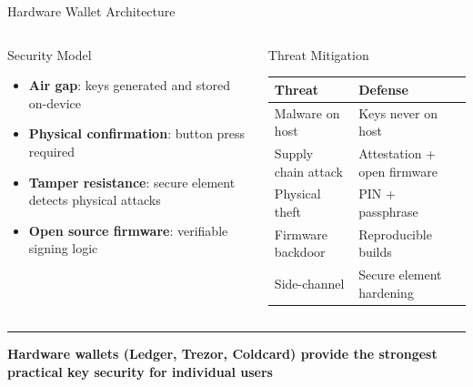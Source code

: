 \documentclass[8pt,aspectratio=169]{beamer}
\newcommand{\bottomnote}[1]{\vfill\vspace{-2mm}\textcolor{mllavender2}{\rule{\textwidth}{0.4pt}}\vspace{1mm}\footnotesize\textbf{#1}}
\begin{document}
\begin{frame}{Hardware Wallet Architecture}
\begin{columns}
\begin{block}{Security Model}
\begin{itemize}\small
  \item \textbf{Air gap}: keys generated and stored on-device
  \item \textbf{Physical confirmation}: button press required
  \item \textbf{Tamper resistance}: secure element detects physical attacks
  \item \textbf{Open source firmware}: verifiable signing logic
\end{itemize}
\end{block}
\begin{block}{Threat Mitigation}
\scriptsize
\begin{tabular}{ll}
\toprule
\textbf{Threat} & \textbf{Defense} \\
\midrule
Malware on host & Keys never on host \\
Supply chain attack & Attestation + open firmware \\
Physical theft & PIN + passphrase \\
Firmware backdoor & Reproducible builds \\
Side-channel & Secure element hardening \\
\bottomrule
\end{tabular}
\end{block}
\end{columns}
\bottomnote{Hardware wallets (Ledger, Trezor, Coldcard) provide the strongest practical key security for individual users}
\end{frame}
\end{document}
